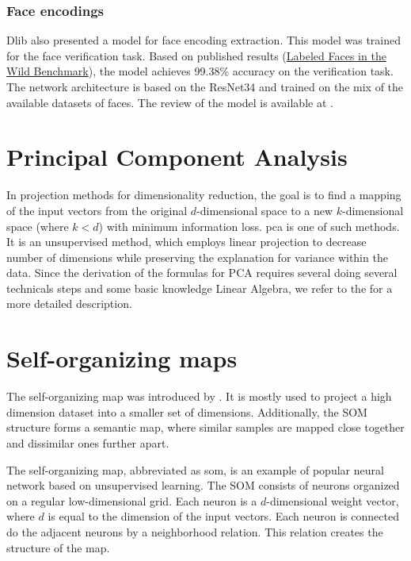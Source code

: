 \subsubsection*{Face encodings}

Dlib also presented a model for face encoding extraction. This model was trained for the face verification task. Based on published results (\href{http://vis-www.cs.umass.edu/lfw/results.html}{Labeled Faces in the Wild Benchmark}), the model achieves  99.38\% accuracy on the verification task. The network architecture is based on the ResNet34 and trained on the mix of the available datasets of faces. The review of the model is available at \citep{king2017high}.

\section{Principal Component Analysis}
\label{s:pca}

In projection methods for dimensionality reduction, the goal is to find a mapping of the input vectors from the original $d$-dimensional space to a new $k$-dimensional space (where $k < d$) with minimum information loss. \acrshort{pca} is one of such methods. It is an unsupervised method, which employs linear projection to decrease number of dimensions while preserving the explanation for variance within the data. Since the derivation of the formulas for PCA requires several doing several technicals steps and some basic knowledge Linear Algebra, we refer to the \cite{alpaydin2020introduction} for a more detailed description.

\section{Self-organizing maps}

The self-organizing map was introduced by \cite{kohonen1982self}. It is mostly used to project a high dimension dataset into a smaller set of dimensions. Additionally, the SOM structure forms a semantic map, where similar samples are mapped close together and dissimilar ones further apart.

The self-organizing map, abbreviated as \acrshort{som}, is an example of popular neural network based on unsupervised learning. The SOM consists of neurons organized on a regular low-dimensional grid. Each neuron is a $d$-dimensional weight vector, where $d$ is equal to the dimension of the input vectors. Each neuron is connected do the adjacent neurons by a neighborhood relation. This relation creates the structure of the map. 

